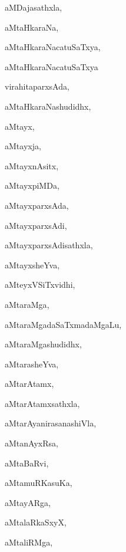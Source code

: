 \begin{multicols}{3}
{\noindent
{aMDajasathxla}, \pageref{aMDajasathxla}

\noindent
{aMtaHkaraNa}, \pageref{aMtaHkaraNa}

\noindent
{aMtaHkaraNacatuSaTxya}, \pageref{aMtaHkaraNacatuSaTxya}

\noindent
{aMtaHkaraNacatuSaTxya}

\noindent
\qquad virahitaparxsAda, \pageref{aMtaHkaraNacatuSaTxyavirahitaparxsAda}

\noindent
{aMtaHkaraNashudidhx}, \pageref{aMtaHkaraNashudidhx}

\noindent
{aMtayx}, \pageref{aMtayx}

\noindent
{aMtayxja}, \pageref{aMtayxja}

\noindent
{aMtayxnAsitx}, \pageref{aMtayxnAsitx}

\noindent
{aMtayxpiMDa}, \pageref{aMtayxpiMDa}

\noindent
{aMtayxparxsAda}, \pageref{aMtayxparxsAda}

\noindent
{aMtayxparxsAdi}, \pageref{aMtayxparxsAdi}

\noindent
{aMtayxparxsAdisathxla}, \pageref{aMtayxparxsAdisathxla}

\noindent
{aMtayxsheYva}, \pageref{aMtayxsheYva}

\noindent
{aMteyxVSiTxvidhi}, \pageref{aMteyxVSiTxvidhi}

\noindent
{aMtaraMga}, \pageref{aMtaraMga}

\noindent
{aMtaraMgadaSaTxmadaMgaLu}, \pageref{aMtaraMgadaSaTxmadaMgaLu}

\noindent
{aMtaraMgashudidhx}, \pageref{aMtaraMgashudidhx}

\noindent
{aMtarasheYva}, \pageref{aMtarasheYva}

\noindent
{aMtarAtamx}, \pageref{aMtarAtamx}

\noindent
{aMtarAtamxsathxla}, \pageref{aMtarAtamxsathxla}

\noindent
{aMtarAyanirasanashiVla}, \pageref{aMtarAyanirasanashiVla}

\noindent
{aMtanAyxRsa}, \pageref{aMtanAyxRsa}

\noindent
{aMtaBaRvi}, \pageref{aMtaBaRvi}

\noindent
{aMtamuRKasuKa}, \pageref{aMtamuRKasuKa}

\noindent
{aMtayARga}, \pageref{aMtayARga}

\noindent
{aMtalaRkaSxyX}, \pageref{aMtalaRkaSxyX}

\noindent
{aMtaliRMga}, \pageref{aMtaliRMga}

}
\end{multicols}
